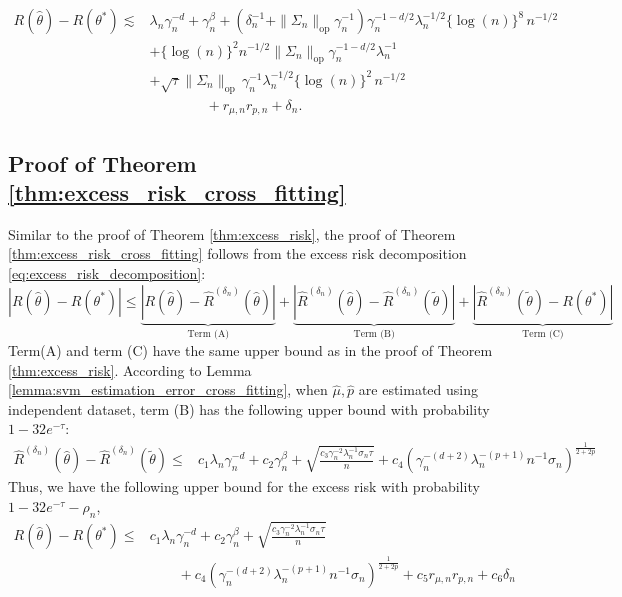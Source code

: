 \documentclass[12pt]{article}
\begin{document}
\begin{align*}
       R(\widehat\theta)-R\left(\theta^*\right)\lesssim & \lambda_n\gamma_n^{-d} + \gamma_n^{\beta} + \left(\delta_n^{-1}+\|\Sigma_n\|_{\mathrm{op}}\gamma_n^{-1}\right)\gamma_n^{-1-d/2}\lambda_n^{-1/2}\{\log(n)\}^{8}\,n^{-1/2}\\
& + \{\log(n)\}^2 n^{-1/2}\|\Sigma_n\|_{\mathrm{op}}\gamma_n^{-1-d/2}\lambda_n^{-1}\\
& + \sqrt{\tau} \|\Sigma_n\|_{\mathrm{op}}\,\gamma_n^{-1}\lambda_n^{-1/2}\{\log(n)\}^2\,n^{-1/2}\\
       & \qquad\qquad + r_{\mu,n}r_{p,n} + {\delta_n}.
    \end{align*}

\subsection{Proof of Theorem \ref{thm:excess_risk_cross_fitting}}

Similar to the proof of Theorem \ref{thm:excess_risk}, the proof of Theorem \ref{thm:excess_risk_cross_fitting} follows from the excess risk decomposition \eqref{eq:excess_risk_decomposition}:
$$ |R(\widehat\theta)-R\left(\theta^*\right)|\leq \underbrace{|R(\widehat\theta)-\widehat R^{({\delta_n})}(\widehat\theta)|}_{\text{Term (A)}} + \underbrace{|\widehat R^{({\delta_n})}(\widehat\theta) - \widehat R^{({\delta_n})}(\tilde\theta)|}_{\text{Term (B)}} + \underbrace{|\widehat R^{({\delta_n})}(\tilde\theta) - R(\theta^*)|}_{\text{Term (C)}} $$
Term(A) and term (C) have the same upper bound as in the proof of Theorem \ref{thm:excess_risk}. According to Lemma \ref{lemma:svm_estimation_error_cross_fitting}, when $\hat\mu,\hat p$ are estimated using independent dataset, term (B) has the following upper bound with probability $1-32e^{-\tau}$:
\begin{align*}
  \widehat R^{({\delta_n})}(\widehat\theta) - \widehat R^{({\delta_n})}(\tilde\theta)\leq & c_1 \lambda_n\gamma_n^{-d} + c_2\gamma_n^{\beta}+ \sqrt{\frac{ c_3\gamma_n^{-2}\lambda_n^{-1}\sigma_n\tau}{n}} + c_4\left(\gamma_n^{-(d+2)}\lambda_n^{-(p+1)}n^{-1}\sigma_n\right)^{\frac{1}{2+2p}} 
\end{align*}
Thus, we have the following upper bound for the excess risk with probability $1-32e^{-\tau} - \rho_n$,
\begin{align*}
       R(\widehat\theta)-R\left(\theta^*\right)\leq & c_1 \lambda_n\gamma_n^{-d} + c_2\gamma_n^{\beta}+ \sqrt{\frac{ c_3\gamma_n^{-2}\lambda_n^{-1}\sigma_n\tau}{n}}   \\
   & \qquad + c_4\left(\gamma_n^{-(d+2)}\lambda_n^{-(p+1)}n^{-1}\sigma_n\right)^{\frac{1}{2+2p}} + c_5r_{\mu,n}r_{p,n}  + c_6{\delta_n}
    \end{align*}
\end{document}
